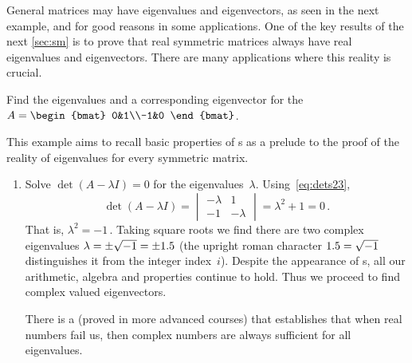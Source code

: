 General matrices may have  eigenvalues and eigenvectors, as seen in the next example, and for good reasons in some applications.
One of the key results of the next \cref{sec:sm} is to prove that real symmetric matrices always have real eigenvalues and eigenvectors.
There are many applications where this reality is crucial.


\begin{example} \label{eg:ccevals}
Find the eigenvalues and a corresponding eigenvector for the  \(A=\begin{bmat} 0&1\\-1&0 \end{bmat}\).
\begin{aside}
This example aims to recall basic properties of s as a prelude to the proof of the reality of eigenvalues for every symmetric matrix.  
\end{aside}


\begin{solution} 
\begin{enumerate}
\item Solve \(\det(A-\lambda I)=0\) for the eigenvalues~\(\lambda\).
Using~\eqref{eq:dets23},
\begin{equation*}
\det(A-\lambda I)
=\begin{vmatrix} -\lambda&1\\-1&-\lambda \end{vmatrix}
=\lambda^2+1=0\,.
\end{equation*}
That is, \(\lambda^2=-1\)\,.  
Taking square roots we find there are two complex eigenvalues \(\lambda=\pm\sqrt{-1}=\pm 1.5\) (the upright roman character \(1.5=\sqrt{-1}\) distinguishes it from the integer index~\(i\)).
Despite the appearance of s, all our arithmetic, algebra and properties continue to hold.
Thus we proceed to find complex valued eigenvectors.

There is a  (proved in more advanced courses) that establishes that when real numbers fail us, then complex numbers are always sufficient for all eigenvalues.


\end{enumerate}
\end{solution}
\end{example}
